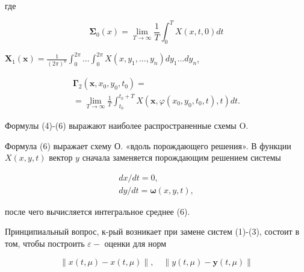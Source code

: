 \documentclass[10pt]{article}
\begin{document}
где



\[

\boldsymbol{\Sigma}_{0}(x)=\lim _{T \rightarrow \infty} \frac{1}{T} \int_{0}^{T} X(x, t, 0) d t

\]



$\boldsymbol{X}_{1}(\boldsymbol{x})=\frac{1}{(2 \pi)^{n}} \int_{0}^{2 \pi} \ldots \int_{0}^{2 \pi} X\left(x, y_{1}, \ldots, y_{n}\right) d y_{1} \ldots d y_{n}$,



\[

\begin{gathered}

\boldsymbol{\Gamma}_{2}\left(\boldsymbol{x}, x_{0}, y_{0}, t_{0}\right)= \\

=\lim _{T \rightarrow \infty} \frac{1}{T} \int_{t_{0}}^{t_{0}+T} X\left(\boldsymbol{x}, \varphi\left(x_{0}, y_{0}, t_{0}, t\right), t\right) d t .

\end{gathered}

\]



Формулы (4)-(6) выражают наиболее распространенные схемы $\mathrm{O}$.



Формула (6) выражает схему О. «вдоль порождающего решения». В функции $X(x, y, t)$ вектор $y$ сначала заменяется порождающим решением системы



\[

\begin{gathered}

d x / d t=0, \\

d y / d t=\boldsymbol{\omega}(x, y, t),

\end{gathered}

\]



после чего вычисляется интегральное среднее (6).



Принципиальный вопрос, к-рый возникает при замене систем (1)-(3), состоит в том, чтобы построить $\varepsilon-$ оценки для норм



\[

\|x(t, \mu)-x(t, \mu)\|, \quad\|y(t, \mu)-\boldsymbol{y}(t, \mu)\|

\]
\end{document}
